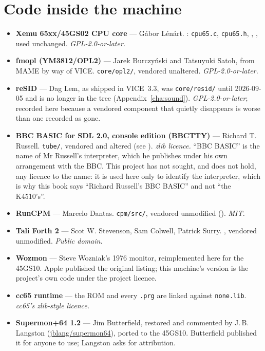 \section{Code inside the machine}
\begin{itemize}[leftmargin=1.4em]
\item \textbf{Xemu 65xx/45GS02 CPU core} --- Gábor Lénárt.
  : \verb|cpu65.c|, \verb|cpu65.h|,
  , ,
  used unchanged. \emph{GPL-2.0-or-later.}
\item \textbf{fmopl (YM3812/OPL2)} --- Jarek Burczyński and Tatsuyuki
  Satoh, from MAME by way of VICE. \verb|core/opl2/|, vendored
  unaltered. \emph{GPL-2.0-or-later.}
\item \textbf{reSID} --- Dag Lem, as shipped in VICE~3.3, was
  \verb|core/resid/| until 2026-09-05 and is no longer in the tree
  (Appendix~\ref{cha:sound}). \emph{GPL-2.0-or-later}; recorded here
  because a vendored component that quietly disappears is worse than one
  recorded as gone.
\item \textbf{BBC BASIC for SDL 2.0, console edition (BBCTTY)} ---
  Richard T. Russell. \verb|tube/|, vendored and altered (see
  ). \emph{zlib licence.} ``BBC BASIC'' is the
  name of Mr Russell's interpreter, which he publishes under his own
  arrangement with the BBC. This project has not sought, and does not
  hold, any licence to the name: it is used here only to identify the
  interpreter, which is why this book says ``Richard Russell's BBC
  BASIC'' and not ``the K4510's''.
\item \textbf{RunCPM} --- Marcelo Dantas. \verb|cpm/src/|, vendored
  unmodified (). \emph{MIT.}
\item \textbf{Tali Forth 2} --- Scot W. Stevenson, Sam Colwell,
  Patrick Surry. , vendored unmodified.
  \emph{Public domain.}
\item \textbf{Wozmon} --- Steve Wozniak's 1976 monitor, reimplemented
  here for the 45GS10. Apple published the original listing; this
  machine's version is the project's own code under the project
  licence.
\item \textbf{cc65 runtime} --- the ROM and every \verb|.prg| are
  linked against \verb|none.lib|. \emph{cc65's zlib-style licence.}
\item \textbf{Supermon+64 1.2} --- Jim Butterfield, restored and
  commented by J.\,B. Langston
  (\href{https://github.com/jblang/supermon64}{jblang/supermon64}),
  ported to the 45GS10. Butterfield published it for anyone to use;
  Langston asks for attribution.
\end{itemize}

